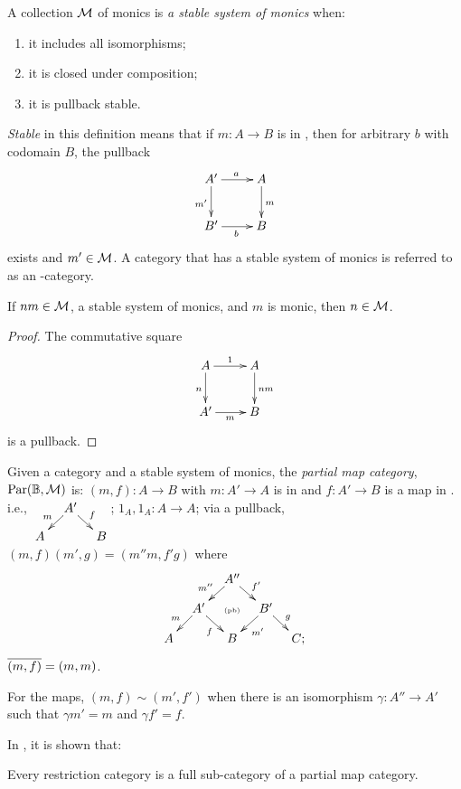 \begin{definition}
  A collection $\mathcal{M}$ of monics is \emph{a stable system of monics}
  when:
  \begin{enumerate}[{(}i{)}]
    \item it includes all isomorphisms;
    \item it is closed under composition;
    \item it is pullback stable.
  \end{enumerate}
\end{definition}

\emph{Stable} in this definition means that if $m:A\to B$ is in \Mstab, then for arbitrary
$b$ with codomain $B$, the pullback
\[
  \xymatrix{
    A'\ar[r]^a \ar[d]_{m'} &A\ar[d]^{m}\\
    B' \ar[r]_{b} & B
  }
\]
exists and $m' \in \mathcal{M}$. A category that has a stable system of monics
is referred to as an \Mstab-category.

\begin{lemma}
  If $n m \in \mathcal{M}$, a stable system of monics, and $m$ is monic, then $n \in \mathcal{M}$.
\end{lemma}
\begin{proof}
  The commutative square
  \[
    \xymatrix{
      A\ar[d]_n \ar[r]^{1} &A\ar[d]^{n m}\\
      A' \ar[r]_{m} & B
    }
  \]
  is a pullback.
\end{proof}

Given a category \B and a stable system of monics, the \emph{partial map category},
$\text{Par}(\mathbb{B},\mathcal{M})$ is:
    {$(m,f):A\to B$  with $m:A' \to A$ is in \Mstab and $f:A' \to B$ is a map in \B. i.e.,
      $\xymatrix @R-15pt @C-15pt{&A'\ar[dl]_{m} \ar[dr]^{f}\\A&&B}$;}
    {$1_A,1_A:A \to A$;}
    {via a pullback, $(m,f)(m',g) = (m'' m, f' g)$ where
      \[
        \xymatrix @C-15pt @R-15pt{
          &&A''\ar[dl]_{m''}\ar[dr]^{f'}\\
          &A'\ar[dl]_{m}\ar[dr]_{f}&\text{{\tiny (pb)}}&B'\ar[dl]^{m'}\ar[dr]^{g}\\
          A&&B&&C;
        }
      \]
    }
    {$\overline{(m,f)} = (m,m)$.}

For the maps, $(m,f) \sim (m',f')$ when there is an isomorphism $\gamma : A'' \to A'$
such that $\gamma m' = m$ and $\gamma f' = f$.

In \cite{cockettlack2003:restcategories2}, it is shown that:
\begin{theorem}
  Every restriction category is a full sub-category of a partial map category.
\end{theorem}
